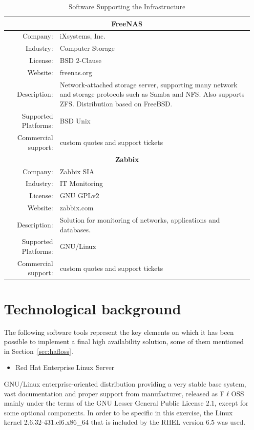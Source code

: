 \documentclass[a4paper, 12pt]{book}
\begin{document}
\begin{table}
\begin{tabular}{ | r m{10cm} | }
    \hline    
    \multicolumn{2}{|c|}{\textbf{FreeNAS}}\\
    \hline
    Company: & iXsystems, Inc. \\
    Industry: & Computer Storage \\
    License: & BSD 2-Clause \\
    Website: & freenas.org \\
    Description: & Network-attached storage server, supporting many network and storage protocols such as Samba and NFS. Also supports ZFS. Distribution based on FreeBSD. \\
    Supported Platforms: & BSD Unix \\
    Commercial support: & custom quotes and support tickets \\
    \hline
    \multicolumn{2}{|c|}{\textbf{Zabbix}}\\
    \hline
    Company: & Zabbix SIA \\
    Industry: & IT Monitoring \\
    License: & GNU GPLv2 \\
    Website: & zabbix.com \\
    Description: & Solution for monitoring of networks, applications and databases. \\
    Supported Platforms: & GNU/Linux \\
    Commercial support: & custom quotes and support tickets \\
    \hline
  \end{tabular}
\caption{Software Supporting the Infrastructure}
\label{table:technologies}
\end{table}


%
\chapter{Technological background}
\label{chap:implemented}

The following software tools represent the key elements on which it has been possible to implement a final high availability solution, some of them mentioned in Section~\ref{sec:hafloss}.

\begin{itemize}
	\item Red Hat Enterprise Linux Server
\end{itemize}

\noindent GNU/Linux enterprise-oriented distribution providing a very stable base system, vast documentation and proper support from manufacturer, released as F$\ell$OSS mainly under the terms of the GNU Lesser General Public License 2.1, except for some optional components. In order to be specific in this exercise, the Linux kernel 2.6.32-431.el6.x86\_64 that is included by the RHEL version 6.5 was used.
\end{document}

